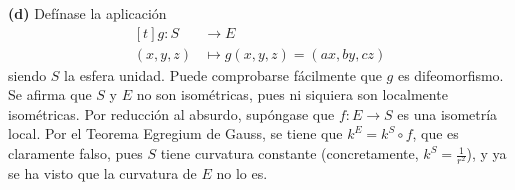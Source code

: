 \documentclass[12pt]{report}
\begin{document}
\vspace{2mm}
\textbf{(d) } Defínase la aplicación
\[\begin{aligned}[t]
    g \colon S &\longrightarrow E \\
    (x,y,z) &\longmapsto g(x,y,z) = (ax,by,cz)
\end{aligned}\]
siendo $S$ la esfera unidad. Puede comprobarse fácilmente que $g$ es difeomorfismo. Se afirma que $S$ y $E$ no son isométricas, pues ni siquiera son localmente isométricas. Por reducción al absurdo, supóngase que $f \colon E \to S$ es una isometría local. Por el Teorema Egregium de Gauss, se tiene que $k^E = k^S \circ f$, que es claramente falso, pues $S$ tiene curvatura constante (concretamente, $k^S = \frac{1}{r^2}$), y ya se ha visto que la curvatura de $E$ no lo es.
\end{document}
